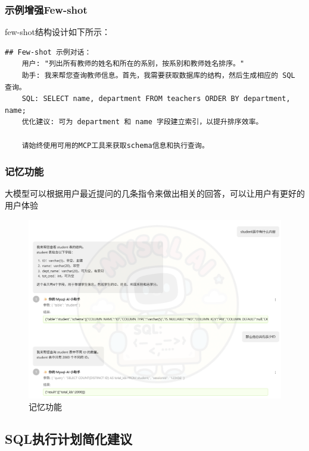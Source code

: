 \documentclass{article}
\begin{document}
	\subsubsection{示例增强Few-shot}
	
	few-shot结构设计如下所示：
	
	\begin{lstlisting}[title=示例增强Few-shot, tabsize=4]
	## Few-shot 示例对话：
	用户: "列出所有教师的姓名和所在的系别，按系别和教师姓名排序。"
	助手: 我来帮您查询教师信息。首先，我需要获取数据库的结构，然后生成相应的 SQL 查询。
	SQL: SELECT name, department FROM teachers ORDER BY department, name;
	优化建议: 可为 department 和 name 字段建立索引，以提升排序效率。
	
	请始终使用可用的MCP工具来获取schema信息和执行查询。
	\end{lstlisting}
	
	\subsubsection{记忆功能}
	
	大模型可以根据用户最近提问的几条指令来做出相关的回答，可以让用户有更好的用户体验
	
	\begin{figure}[H]
		\centering
		\includegraphics[width=13cm]{./images/7.记忆.jpg}
		\caption{记忆功能}
	\end{figure}
	
	\subsection{SQL执行计划简化建议}
	
\end{document}
